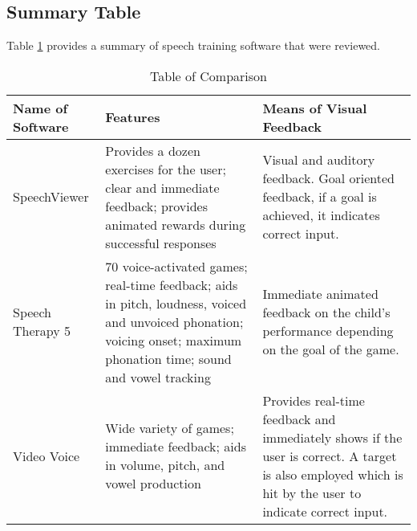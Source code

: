 \subsection{Summary Table}
Table \ref{tab:comparisontable2} provides a summary of speech training software that were reviewed.
\begin{table}[h!]   %
\centering
\caption{Table of Comparison} \vspace{0.25em}
\begin{tabular}{|p{1.5in}|p{2in}|p{2in}|}
 \hline
\centering
Name of Software & Features & Means of Visual Feedback \\ \hline
	SpeechViewer
		& Provides a dozen exercises for the user; clear and immediate feedback; provides animated rewards during successful responses 
		& Visual and auditory feedback. Goal oriented feedback, if a goal is achieved, it indicates correct input.
		\\ \hline
	Speech Therapy 5
		& 70 voice-activated games; real-time feedback; aids in pitch, loudness, voiced and unvoiced phonation; voicing onset; maximum phonation time; sound and vowel tracking
		& Immediate animated feedback on the child's performance depending on the goal of the game.
		\\ \hline
	Video Voice
		& Wide variety of games; immediate feedback; aids in volume, pitch, and vowel production
		& Provides real-time feedback and immediately shows if the user is correct. A target is also employed which is hit by the user to indicate correct input. 
		\\ \hline
\end{tabular}
\label{tab:comparisontable2}
\end{table}